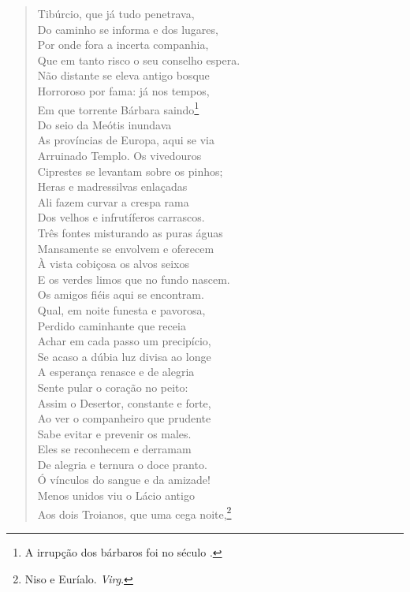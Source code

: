 \begin{verse}
Tibúrcio, que já tudo penetrava,\\
Do caminho se informa e dos lugares,\\
Por onde fora a incerta companhia,\\
Que em tanto risco o seu conselho espera. \\[10pt]


Não distante se eleva antigo bosque\\
Horroroso por fama: já nos tempos,\\
Em que torrente Bárbara saindo\footnote{ A irrupção dos bárbaros foi no século .}\\
Do seio da Meótis inundava\\                   %
As províncias de Europa, aqui se via\\
Arruinado Templo. Os vivedouros\\
Ciprestes se levantam sobre os pinhos;\\
Heras e madressilvas enlaçadas\\
Ali fazem curvar a crespa rama\\
Dos velhos e infrutíferos carrascos.\\
Três fontes misturando as puras águas\\
Mansamente se envolvem e oferecem\\
À vista cobiçosa os alvos seixos\\
E os verdes limos que no fundo nascem.\\
Os amigos fiéis aqui se encontram.\\
Qual, em noite funesta e pavorosa,\\
Perdido caminhante que receia\\
Achar em cada passo um precipício,\\
Se acaso a dúbia luz divisa ao longe\\
A esperança renasce e de alegria\\
Sente pular o coração no peito:\\
Assim o Desertor, constante e forte,\\
Ao ver o companheiro que prudente\\
Sabe evitar e prevenir os males.\\
Eles se reconhecem e derramam\\
De alegria e ternura o doce pranto.\\
Ó vínculos do sangue e da amizade!\\
Menos unidos viu o Lácio antigo\\
Aos dois Troianos, que uma cega noite,\footnote{ Niso e Euríalo. \textit{Virg}.}\\		\index{\Niso}

\end{verse}
